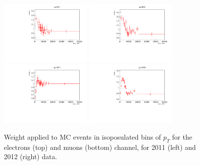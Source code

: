 \begin{figure}[h!]
\centering
\includegraphics[width=0.40\textwidth]{RKst/figs/Weights/EE_wBPT_2011.pdf}
\includegraphics[width=0.40\textwidth]{RKst/figs/Weights/EE_wBPT_2012.pdf} \\
\includegraphics[width=0.40\textwidth]{RKst/figs/Weights/MM_wBPT_2011.pdf}
\includegraphics[width=0.40\textwidth]{RKst/figs/Weights/MM_wBPT_2012.pdf}
\caption{Weight applied to MC events in isoposulated bins of \Bz $p_T$ for the electrons (top) and muons (bottom) channel, for 2011 (left) and 2012 (right) data. }
\label{fig:B0ptW}
\end{figure}

